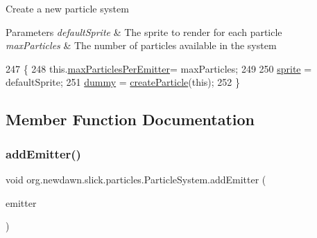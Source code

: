 Create a new particle system


\begin{DoxyParams}{Parameters}
{\em default\+Sprite} & The sprite to render for each particle \\
\hline
{\em max\+Particles} & The number of particles available in the system \\
\hline
\end{DoxyParams}

\begin{DoxyCode}
247                                                                  \{
248         this.\mbox{\hyperlink{classorg_1_1newdawn_1_1slick_1_1particles_1_1_particle_system_a388bac741ed59a82c0f7bbf0fc308673}{maxParticlesPerEmitter}}= maxParticles;
249     
250         \mbox{\hyperlink{classorg_1_1newdawn_1_1slick_1_1particles_1_1_particle_system_a42359ac9175deb095eaa520263e352da}{sprite}} = defaultSprite;
251         \mbox{\hyperlink{classorg_1_1newdawn_1_1slick_1_1particles_1_1_particle_system_aa0d598380df6fa8819ea082fef03f3aa}{dummy}} = \mbox{\hyperlink{classorg_1_1newdawn_1_1slick_1_1particles_1_1_particle_system_ac03492cca10c01f7df6968e4293f65b7}{createParticle}}(\textcolor{keyword}{this});
252     \}
\end{DoxyCode}


\subsection{Member Function Documentation}
\mbox{\label{classorg_1_1newdawn_1_1slick_1_1particles_1_1_particle_system_abeb4a1cb7f8677cf28b82f1e49f1f0ce}} 
\subsubsection{\texorpdfstring{add\+Emitter()}{addEmitter()}}
{\footnotesize\ttfamily void org.\+newdawn.\+slick.\+particles.\+Particle\+System.\+add\+Emitter (\begin{DoxyParamCaption}\item[{\mbox{\hyperlink{interfaceorg_1_1newdawn_1_1slick_1_1particles_1_1_particle_emitter}{Particle\+Emitter}}}]{emitter }\end{DoxyParamCaption})\hspace{0.3cm}{\ttfamily [inline]}}

